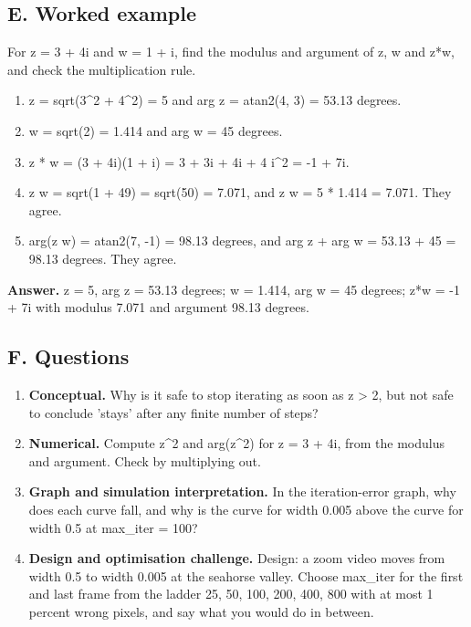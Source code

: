 \documentclass[11pt,a4paper]{article}
\begin{document}
\subsection*{E. Worked example}
For z = 3 + 4i and w = 1 + i, find the modulus and argument of z, w and z*w, and check the multiplication rule.
\begin{enumerate}[nosep]
\item \textbar{}z\textbar{} = sqrt(3\textasciicircum{}2 + 4\textasciicircum{}2) = 5 and arg z = atan2(4, 3) = 53.13 degrees.
\item \textbar{}w\textbar{} = sqrt(2) = 1.414 and arg w = 45 degrees.
\item z * w = (3 + 4i)(1 + i) = 3 + 3i + 4i + 4 i\textasciicircum{}2 = -1 + 7i.
\item \textbar{}z w\textbar{} = sqrt(1 + 49) = sqrt(50) = 7.071, and \textbar{}z\textbar{} \textbar{}w\textbar{} = 5 * 1.414 = 7.071. They agree.
\item arg(z w) = atan2(7, -1) = 98.13 degrees, and arg z + arg w = 53.13 + 45 = 98.13 degrees. They agree.
\end{enumerate}
\textbf{Answer.} \textbar{}z\textbar{} = 5, arg z = 53.13 degrees; \textbar{}w\textbar{} = 1.414, arg w = 45 degrees; z*w = -1 + 7i with modulus 7.071 and argument 98.13 degrees.

\subsection*{F. Questions}
\begin{enumerate}[nosep]
\item \textbf{Conceptual.} Why is it safe to stop iterating as soon as \textbar{}z\textbar{} \textgreater{} 2, but not safe to conclude 'stays' after any finite number of steps?
\item \textbf{Numerical.} Compute \textbar{}z\textasciicircum{}2\textbar{} and arg(z\textasciicircum{}2) for z = 3 + 4i, from the modulus and argument. Check by multiplying out.
\item \textbf{Graph and simulation interpretation.} In the iteration-error graph, why does each curve fall, and why is the curve for width 0.005 above the curve for width 0.5 at max\_iter = 100?
\item \textbf{Design and optimisation challenge.} Design: a zoom video moves from width 0.5 to width 0.005 at the seahorse valley. Choose max\_iter for the first and last frame from the ladder 25, 50, 100, 200, 400, 800 with at most 1 percent wrong pixels, and say what you would do in between.
\end{enumerate}
\end{document}
